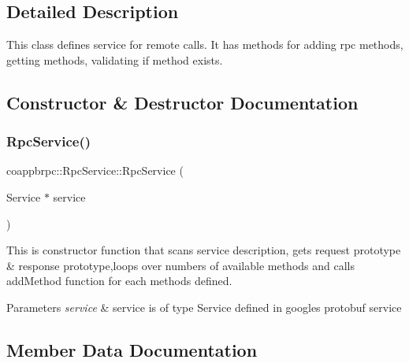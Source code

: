 \subsection{Detailed Description}
This class defines service for remote calls. It has methods for adding rpc methods, getting methods, validating if method exists. 

\subsection{Constructor \& Destructor Documentation}
\mbox{\label{classcoappbrpc_1_1RpcService_a66c75fc19a62dbf650f4dc5080d15bfa}} 
\subsubsection{\texorpdfstring{Rpc\+Service()}{RpcService()}}
{\footnotesize\ttfamily coappbrpc\+::\+Rpc\+Service\+::\+Rpc\+Service (\begin{DoxyParamCaption}\item[{Service $\ast$}]{service }\end{DoxyParamCaption})\hspace{0.3cm}{\ttfamily [inline]}}



This is constructor function that scans service description, gets request prototype \& response prototype,loops over numbers of available methods and calls add\+Method function for each methods defined. 


\begin{DoxyParams}{Parameters}
{\em service} & service is of type Service defined in google\textquotesingle{}s protobuf service \\
\hline
\end{DoxyParams}


\subsection{Member Data Documentation}
\mbox{\label{classcoappbrpc_1_1RpcService_a14b0b1bae1efc308e1c61d7737b7c4ac}} 
